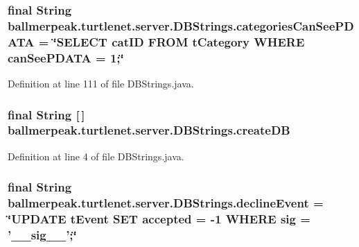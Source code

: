 \hypertarget{classballmerpeak_1_1turtlenet_1_1server_1_1DBStrings_af323bc7e8a4dfe7f7f321a0f868b234b}{
\subsubsection[{categories\-Can\-See\-P\-D\-A\-T\-A}]{\setlength{\rightskip}{0pt plus 5cm}final String ballmerpeak.\-turtlenet.\-server.\-D\-B\-Strings.\-categories\-Can\-See\-P\-D\-A\-T\-A = \char`\"{}S\-E\-L\-E\-C\-T cat\-I\-D F\-R\-O\-M t\-Category W\-H\-E\-R\-E {\bf can\-See\-P\-D\-A\-T\-A} = 1;\char`\"{}\hspace{0.3cm}{\ttfamily [static]}}}\label{classballmerpeak_1_1turtlenet_1_1server_1_1DBStrings_af323bc7e8a4dfe7f7f321a0f868b234b}


Definition at line 111 of file D\-B\-Strings.\-java.

\hypertarget{classballmerpeak_1_1turtlenet_1_1server_1_1DBStrings_a70ba551ea4397e98cc09b96eb0d9ff43}{
\subsubsection[{create\-D\-B}]{\setlength{\rightskip}{0pt plus 5cm}final String \mbox{[}$\,$\mbox{]} ballmerpeak.\-turtlenet.\-server.\-D\-B\-Strings.\-create\-D\-B\hspace{0.3cm}{\ttfamily [static]}}}\label{classballmerpeak_1_1turtlenet_1_1server_1_1DBStrings_a70ba551ea4397e98cc09b96eb0d9ff43}


Definition at line 4 of file D\-B\-Strings.\-java.

\hypertarget{classballmerpeak_1_1turtlenet_1_1server_1_1DBStrings_a17aab2fc0a6a4f06d268a67e4e7104d4}{
\subsubsection[{decline\-Event}]{\setlength{\rightskip}{0pt plus 5cm}final String ballmerpeak.\-turtlenet.\-server.\-D\-B\-Strings.\-decline\-Event = \char`\"{}U\-P\-D\-A\-T\-E t\-Event S\-E\-T accepted = -\/1 W\-H\-E\-R\-E sig = '\-\_\-\-\_\-sig\-\_\-\-\_\-';\char`\"{}\hspace{0.3cm}{\ttfamily [static]}}}\label{classballmerpeak_1_1turtlenet_1_1server_1_1DBStrings_a17aab2fc0a6a4f06d268a67e4e7104d4}


